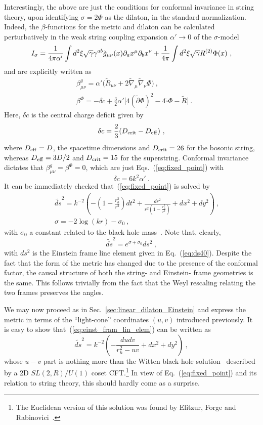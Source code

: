 \documentclass[a4paper, 12pt]{article}
\def\s{\sigma}
\def\be{\begin{equation}}
\def\ee{\end{equation}}
\def\bea{\begin{eqnarray}}
\def\eea{\end{eqnarray}}
\begin{document}
Interestingly, the above are just the conditions for conformal invariance in string theory,  upon identifying $\s =2\Phi$ as the dilaton, in the standard normalization. Indeed, the $\beta$-functions for the metric and dilaton can be calculated perturbatively in the weak string coupling expansion $\alpha'\to 0$ of the $\sigma$-model
\be
\label{eq:sigma}
I_{\rm \sigma}=\frac{1}{4\pi \alpha'}
\int d^2 \xi \sqrt{\gamma} \gamma^{ab} \tilde g_{\mu\nu}(x) \partial_a x^\mu \partial_b x^\nu +\frac{1}{4\pi}\int d^2 \xi \sqrt{\gamma} R^{(2)} \Phi(x) \ , 
\ee
and are explicitly written as 
\be
\begin{aligned}
\label{eq:beta-functions}
&\beta_{\mu\nu}^g=\alpha'\big(\widetilde R_{\mu\nu} +2\widetilde\nabla_\mu \widetilde\nabla_\nu \Phi\big) \ ,
 \\
&\beta^\Phi=-\delta c+\frac{3}{2}\alpha'\Big[  4(\tilde \partial \Phi)^2 
-4 \widetilde\square \Phi- \widetilde R\Big] \  .
\end{aligned}
\ee
Here, $\delta c$ is the central charge deficit given by
\be
\delta c=\frac{2}{3}(D_{\rm{crit}}-D_{\rm{eff}}) \ ,     
\ee
where $D_{\rm{eff}}=D$, the spacetime dimensions and $D_{\rm{crit}}=26$ for the bosonic string, whereas
$D_{\rm{eff}}=3D/2$ and $D_{\rm{crit}}=15$ for the superstring. 
Conformal invariance dictates that  $\beta_{\mu\nu}^g=\beta^\Phi=0$,  which are just 
Eqs.~(\ref{eq:fixed_point}) with
\be
\delta c= 6k^2\alpha'  \ .
\ee
It can be immediately checked that~(\ref{eq:fixed_point}) is solved by 
\bea
\label{eq:einst_fram_lin_elem}
&&\widetilde{ds}^2 =k^{-2} \left(-\left(1-\frac{r_h^2}{r^2}\right)dt^2+\frac{dr^2}{r^2\left(1-\frac{r_h^2}{r^2}\right)}+dx^2+dy^2\right)\ , \\ 
&&\sigma=-2\log (kr)-\s_0 \ , 
\eea
with $\s_0$ a constant related to the black hole mass~\cite{Witten:1991yr}. Note that, clearly, 
\be
\widetilde{ds}^2 = e^{\sigma+\sigma_0} ds^2 \ , 
\ee
with $ds^2$ is the Einstein frame line element given in Eq.~(\ref{eq:ds40}). Despite the fact that the form of the metric has changed due to the presence of the conformal factor, the causal structure of both the string- and Einstein- frame geometries is the same. This follows trivially from the fact that the Weyl rescaling relating the two frames preserves the angles. 

We may now proceed as in Sec.~\ref{sec:linear_dilaton_Einstein} and express the metric in terms of the ``light-cone'' coordinates $(u,v)$ introduced previously. It is easy to show that~(\ref{eq:einst_fram_lin_elem}) can be written as
\be
\label{eq:met_jordan_frame}
\widetilde{ds}^2 = k^{-2}\left(-\frac{du dv} {r_h^2-u v }+ dx^2+ dy^2\right) \ ,
\ee
whose $u-v$ part is nothing  more than the Witten black-hole  solution~\cite{Witten:1991yr} described by a  
2D $SL(2,R)/U(1)$ coset CFT.\footnote{The Euclidean version 
of this solution was found by Elitzur, Forge and Rabinovici~\cite{Rabino}.} In view of Eq.~(\ref{eq:fixed_point}) and its relation to string theory, this should hardly come as a surprise. 
\end{document}
